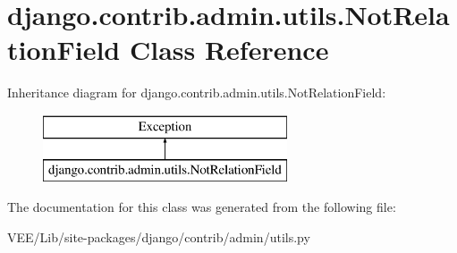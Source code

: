 \hypertarget{classdjango_1_1contrib_1_1admin_1_1utils_1_1_not_relation_field}{}\section{django.\+contrib.\+admin.\+utils.\+Not\+Relation\+Field Class Reference}
\label{classdjango_1_1contrib_1_1admin_1_1utils_1_1_not_relation_field}
Inheritance diagram for django.\+contrib.\+admin.\+utils.\+Not\+Relation\+Field\+:\begin{figure}[H]
\begin{center}
\leavevmode
\includegraphics[height=2.000000cm]{classdjango_1_1contrib_1_1admin_1_1utils_1_1_not_relation_field}
\end{center}
\end{figure}


The documentation for this class was generated from the following file\+:\begin{DoxyCompactItemize}
\item 
V\+E\+E/\+Lib/site-\/packages/django/contrib/admin/utils.\+py\end{DoxyCompactItemize}
